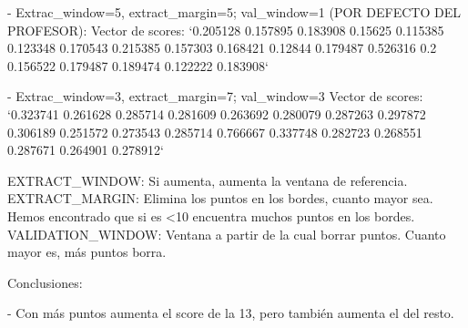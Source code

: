 \documentclass[11pt]{article}
\begin{document}
- Extrac_window=5, extract_margin=5; val_window=1 (POR DEFECTO DEL PROFESOR):
Vector de scores:
`0.205128 0.157895 0.183908 0.15625 0.115385 0.123348 0.170543 0.215385 0.157303 0.168421 0.12844 0.179487 0.526316 0.2 0.156522 0.179487 0.189474 0.122222 0.183908`

- Extrac_window=3, extract_margin=7; val_window=3
Vector de scores:
`0.323741 0.261628 0.285714 0.281609 0.263692 0.280079 0.287263 0.297872 0.306189 0.251572 0.273543 0.285714 0.766667 0.337748 0.282723 0.268551 0.287671 0.264901 0.278912`

EXTRACT_WINDOW: Si aumenta, aumenta la ventana de referencia.
EXTRACT_MARGIN: Elimina los puntos en los bordes, cuanto mayor sea. Hemos encontrado que si es <10 encuentra muchos puntos en los bordes.
VALIDATION_WINDOW: Ventana a partir de la cual borrar puntos. Cuanto mayor es, más puntos borra.


Conclusiones:

- Con más puntos aumenta el score de la 13, pero también aumenta el del resto.
\end{document}
